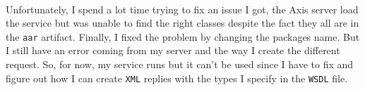 \paragraph{}{
    Unfortunately, I spend a lot time trying to fix an issue I got, the Axis 
 server load the service but was unable to find the right classes despite the
 fact they all are in the \texttt{aar} artifact. Finally, I fixed the problem
 by changing the packages name. But I still have an error coming from my server
 and the way I create the different request. So, for now, my service runs but it
 can't be used since I have to fix and figure out how I can create \texttt{XML}
 replies with the types I specify in the \texttt{WSDL} file.
}

